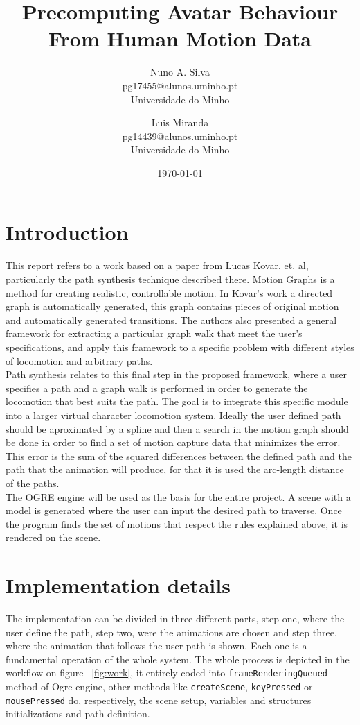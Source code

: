 \documentclass[a4paper]{article}
\title{Precomputing Avatar Behaviour From Human Motion Data}
\date{\today}
\author{
Nuno A. Silva\\ \small pg17455@alunos.uminho.pt \\ Universidade do Minho
\and
Luis Miranda\\ \small pg14439@alunos.uminho.pt \\ Universidade do Minho
}
\begin{document}
\maketitle



\section{Introduction}
This report refers to a work based on a paper from Lucas Kovar, et. al\cite{motiongraphs}, particularly the path synthesis technique described there. Motion Graphs is a method for creating realistic, controllable motion. In Kovar's work a directed graph is automatically generated, this graph contains pieces of original motion and automatically generated transitions. The authors also presented a general framework for extracting a particular graph walk that meet the user's specifications, and apply this framework to a specific problem with different styles of locomotion and arbitrary paths. \\

Path synthesis relates to this final step in the proposed framework, where a user specifies a path and a graph walk is performed in order to generate the locomotion that best suits the path. The goal is to integrate this specific module into a larger virtual character locomotion system. Ideally the user defined path should be aproximated by a spline and then a search in the motion graph should be done in order to find a set of motion capture data that minimizes the error. This error is the sum of the squared differences between the defined path and the path that the animation will produce, for that it is used the arc-length distance of the paths. \\

The OGRE engine will be used as the basis for the entire project. A scene with a model is generated where the user can input the desired path to traverse. Once the program finds the set of motions that respect the rules explained above, it is rendered on the scene. \\



\section{Implementation details}
The implementation can be divided in three  different parts, step one, where the user define the path, step two, were the animations are chosen and step three, where the animation that follows the user path is shown. Each one is a fundamental operation of the whole system. The whole process is depicted in the workflow on figure ~\ref{fig:work}, it entirely coded into \texttt{frameRenderingQueued} method of Ogre engine, other methods like \texttt{createScene}, \texttt{keyPressed} or \texttt{mousePressed} do, respectively, the scene setup, variables and structures initializations and path definition. \\
\end{document}
